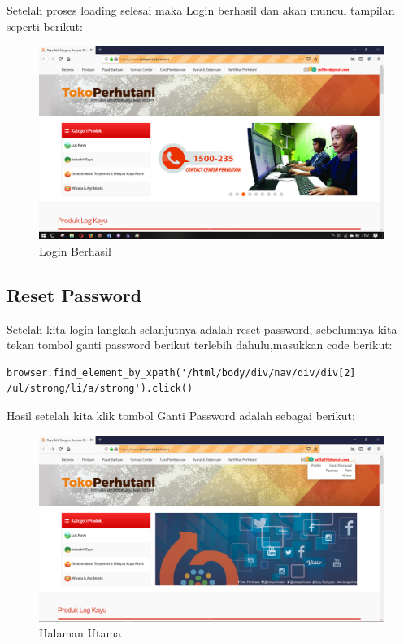 Setelah proses loading selesai maka Login berhasil dan akan muncul tampilan seperti berikut:
\begin{figure}[h]
 	\centering
 	\includegraphics[scale=0.20]{figures/2login}
 	\caption{Login Berhasil}
\end{figure}

\newpage
\subsection{Reset Password}
Setelah kita login langkah selanjutnya adalah reset password, sebelumnya kita tekan tombol ganti password berikut terlebih dahulu,masukkan code berikut:

\begin{verbatim}
browser.find_element_by_xpath('/html/body/div/nav/div/div[2]
/ul/strong/li/a/strong').click()
\end{verbatim} 

Hasil setelah kita klik tombol Ganti Password adalah sebagai berikut: 
\begin{figure}[h]
	\centering
	\includegraphics[scale=0.32]{figures/1GantiPassword}
	\caption{Halaman Utama}
\end{figure}


